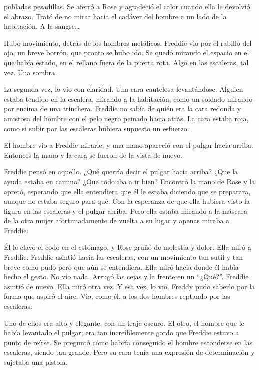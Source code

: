 {pobladas pesadillas. Se aferró a Rose y agradeció el calor cuando ella
	le devolvió el abrazo. Trató de no mirar hacia el cadáver del hombre a
	un lado de la habitación. A la sangre\ldots{}}

{Hubo movimiento, detrás de los hombres metálicos. Freddie vio por el
	rabillo del ojo, un breve borrón, que pronto se hubo ido. Se quedó
	mirando el espacio en el que había estado, en el rellano fuera de la
puerta rota. Algo en las escaleras, tal vez. Una sombra.}

{La segunda vez, lo vio con claridad. Una cara cautelosa levantándose.
	Alguien estaba tendido en la escalera, mirando a la habitación, como un
	soldado mirando por encima de una trinchera. Freddie no sabía de quién
	era la cara redonda y amistosa del hombre con el pelo negro peinado
	hacia atrás. La cara estaba roja, como si subir por las escaleras
hubiera supuesto un esfuerzo.}

{El hombre vio a Freddie mirarle, y una mano apareció con el pulgar
	hacia arriba. Entonces la mano y la cara se fueron de la vista de
nuevo.}

{Freddie pensó en aquello. ¿Qué querría decir el pulgar hacia arriba?
	¿Que la ayuda estaba en camino? ¿Que todo iba a ir bien? Encontró la
	mano de Rose y la apretó, esperando que ella entendiera que él le estaba
	diciendo que se preparara, aunque no estaba seguro para qué. Con la
	esperanza de que ella hubiera visto la figura en las escaleras y el
	pulgar arriba. Pero ella estaba mirando a la máscara de la otra mujer
afortunadamente de vuelta a su lugar y apenas miraba a Freddie.}

{Él le clavó el codo en el estómago, y Rose gruñó de molestia y dolor.
	Ella miró a Freddie. Freddie asintió hacia las escaleras, con un
	movimiento tan sutil y tan breve como pudo pero que aún se entendiera.
	Ella miró hacia donde él había hecho el gesto. No vio nada. Arrugó las
	cejas y la frente en un ``¿Qué?''. Freddie asintió de nuevo. Ella miró
	otra vez. Y esa vez, lo vio. Freddy pudo saberlo por la forma que aspiró
el aire. Vio, como él, a los dos hombres reptando por las escaleras.}

{Uno de ellos era alto y elegante, con un traje oscuro. El otro, el
	hombre que le había levantado el pulgar, era tan increíblemente gordo
	que Freddie estuvo a punto de reírse. Se preguntó cómo habría conseguido
	el hombre esconderse en las escaleras, siendo tan grande. Pero su cara
tenía una expresión de determinación y sujetaba una pistola.}

